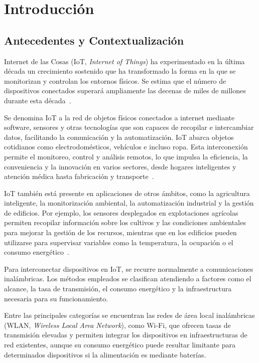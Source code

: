 \chapter{Introducción}\label{chap:1}

\section{Antecedentes y Contextualización}

Internet de las Cosas (IoT, \textit{Internet of Things}) ha experimentado en la última década un crecimiento sostenido que ha transformado la forma en la que se monitorizan y controlan los entornos físicos. Se estima que el número de dispositivos conectados superará ampliamente las decenas de miles de millones durante esta década~\cite{chaudhari2020lpwan}.  

Se denomina IoT a la red de objetos físicos conectados a internet mediante software, sensores y otras tecnologías que son capaces de recopilar e intercambiar datos, facilitando la comunicación y la automatización. IoT abarca objetos cotidianos como electrodomésticos, vehículos e incluso ropa. Esta interconexión permite el monitoreo, control y análisis remotos, lo que impulsa la eficiencia, la conveniencia y la innovación en varios sectores, desde hogares inteligentes y atención médica hasta fabricación y transporte~\cite{fortinet_iot}.


IoT también está presente en aplicaciones de otros ámbitos, como la agricultura inteligente, la monitorización ambiental, la automatización industrial y la gestión de edificios. Por ejemplo, los sensores desplegados en explotaciones agrícolas permiten recopilar información sobre los cultivos y las condiciones ambientales para mejorar la gestión de los recursos, mientras que en los edificios pueden utilizarse para supervisar variables como la temperatura, la ocupación o el consumo energético~\cite{comisionEuropeaIoT,uit2023agricultura}. 
 
Para interconectar dispositivos en IoT, se recurre normalmente a comunicaciones inalámbricas. Los métodos empleados se clasifican atendiendo a factores como el alcance, la tasa de transmisión, el consumo energético y la infraestructura necesaria para su funcionamiento.  

Entre las principales categorías se encuentran las redes de área local inalámbricas (WLAN, \textit{Wireless Local Area Network}), como Wi-Fi, que ofrecen tasas de transmisión elevadas y permiten integrar los dispositivos en infraestructuras de red existentes, aunque su consumo energético puede resultar limitante para determinados dispositivos si la alimentación es mediante baterías.

